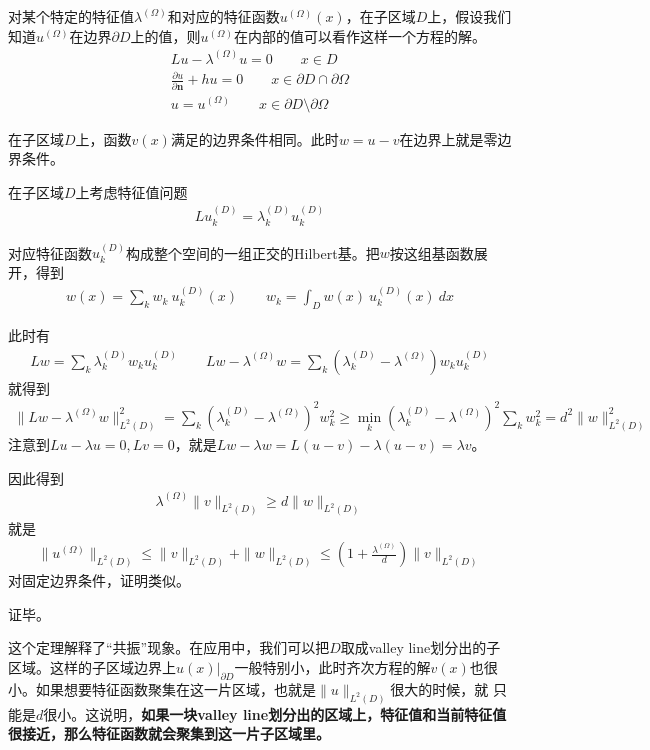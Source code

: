 \documentclass[12pt,a4paper]{article}
\begin{document}
对某个特定的特征值$\lambda^{(\Omega)}$和对应的特征函数$u^{(\Omega)}(x)$，在子区域$D$上，假设我们知道$u^{(\Omega)}$在边界$\partial D$上的值，则$u^{(\Omega)}$在内部的值可以看作这样一个方程的解。
\begin{align}
L u - \lambda^{(\Omega)} u = 0 \qquad x \in D \\
\frac{\partial u}{\partial \mathbf{n}} + h u = 0 \qquad x \in \partial D \cap \partial \Omega \\
u = u^{(\Omega)} \qquad x \in \partial D \setminus \partial \Omega
\end{align}

在子区域$D$上，函数$v(x)$满足的边界条件相同。此时$w = u - v$在边界上就是零边界条件。

在子区域$D$上考虑特征值问题
\begin{align}
L u_k^{(D)} = \lambda_k^{(D)} u_k^{(D)}
\end{align}

对应特征函数$u_k^{(D)}$构成整个空间的一组正交的Hilbert基。把$w$按这组基函数展开，得到
\begin{align}
w(x) = \sum_k w_k \ u_k^{(D)}(x) \qquad w_k = \int_{D} w(x) \ u_k^{(D)}(x) \ dx
\end{align}

此时有
\begin{align}
L w = \sum_k \lambda_k^{(D)} w_k u_k^{(D)} \qquad L w - \lambda^{(\Omega)} w = \sum_k (\lambda_k^{(D)} - \lambda^{(\Omega)}) w_k u_k^{(D)}
\end{align}
就得到
\begin{align}\label{eq0}
\| L w - \lambda^{(\Omega)} w \|_{L^2(D)}^2 = \sum_k (\lambda_k^{(D)} - \lambda^{(\Omega)})^2 w_k^2 \geq \min_k (\lambda_k^{(D)} - \lambda^{(\Omega)})^2\sum_k w_k^2 = d^2 \|w\|_{L^2(D)}^2
\end{align}
注意到$L u - \lambda u = 0, L v = 0$，就是$L w - \lambda w = L(u - v) - \lambda(u - v) = \lambda v$。

因此得到
\begin{align}
\lambda^{(\Omega)} \| v \|_{L^2(D)} \geq d \|w\|_{L^2(D)}
\end{align}
就是
\begin{align}
\|u^{(\Omega)}\|_{L^2(D)} \leq \|v\|_{L^2(D)} + \|w\|_{L^2(D)} \leq (1 + \frac{\lambda^{(\Omega)}}{d}) \|v\|_{L^2(D)}
\end{align}
对固定边界条件，证明类似。

证毕。

这个定理解释了“共振”现象。在应用中，我们可以把$D$取成valley line划分出的子区域。这样的子区域边界上$u(x)|_{\partial D}$一般特别小，此时齐次方程的解$v(x)$也很小。如果想要特征函数聚集在这一片区域，也就是$\|u\|_{L^2(D)}$很大的时候，就 只能是$d$很小。这说明，\textbf{如果一块valley line划分出的区域上，特征值和当前特征值很接近，那么特征函数就会聚集到这一片子区域里。}
\end{document}
